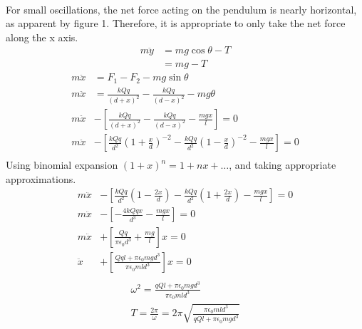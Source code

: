 \documentclass[]{article}
\begin{document}
{\begin{enumerate}
			\paragraph{} For small oscillations, the net force acting on the pendulum is nearly horizontal, as apparent by figure 1. Therefore, it is appropriate to only take the net force along the x axis.
			\begin{equation*}
				\begin{split}
					m\ddot{y} &= mg \cos \theta - T \\
					&= mg - T
				\end{split}
			\end{equation*}
			\begin{equation*}
				\begin{split}
					m\ddot{x} &= F_1 - F_2 - mg \sin \theta \\
					m\ddot{x} &= \frac{kQq}{(d+x)^2} - \frac{kQq}{(d-x)^2} - mg\theta \\
					m\ddot{x} &- \left[ \frac{kQq}{(d+x)^2} - \frac{kQq}{(d-x)^2} - \frac{mgx}{l} \right] = 0 \\
					m\ddot{x} &- \left[ \frac{kQq}{d^2}(1+\tfrac{x}{d})^{-2} - \frac{kQq}{d^2}(1-\tfrac{x}{d})^{-2} - \frac{mgx}{l} \right] = 0 \\
				\end{split}
			\end{equation*}
			Using binomial expansion $(1 + x)^n = 1 + nx + \dots $, and taking appropriate approximations.
			\begin{equation*}
				\begin{split}
					m\ddot{x} &- \left[ \frac{kQq}{d^2}(1-\tfrac{2x}{d}) - \frac{kQq}{d^2}(1+\tfrac{2x}{d}) - \frac{mgx}{l} \right] = 0 \\
					m\ddot{x} &- \left[ -\tfrac{4kQqx}{d^3} - \frac{mgx}{l} \right] = 0 \\
					m\ddot{x} &+ \left[ \tfrac{Qq}{\pi \epsilon_0 d^3} + \frac{mg}{l} \right]x = 0 \\
					\ddot{x} &+ \left[ \tfrac{Qql + \pi \epsilon_0 mgd^3}{\pi \epsilon_0 mld^3} \right]x = 0 \\
				\end{split}
			\end{equation*}
			\begin{equation*}
				\begin{split}
					\omega^2 = \frac{qQl + \pi \epsilon_0 mgd^3}{\pi \epsilon_0 mld^3} \\
					T = \frac{2\pi}{\omega} = 2\pi \sqrt{\frac{\pi \epsilon_0 mld^3}{qQl + \pi \epsilon_0 mgd^3}} \\

\end{split}
\end{equation*}
\end{enumerate}}
\end{document}
